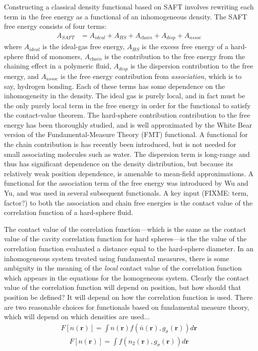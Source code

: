 \documentclass[letterpaper,twocolumn,amsmath,amssymb,prb]{revtex4-1}
\newcommand{\rr}{\textbf{r}}
\begin{document}
Constructing a classical density functional based on SAFT involves
rewriting each term in the free energy as a functional of an
inhomogeneous density.  The SAFT free energy consists of four terms:
\begin{align}
  A_\textit{SAFT} &= A_\textit{ideal} + A_\textit{HS} + A_\textit{chain} + A_\textit{disp} + A_\textit{assoc}
\end{align}
where $A_\textit{ideal}$ is the ideal-gas free energy, $A_\textit{HS}$
is the excess free energy of a hard-sphere fluid of monomers,
$A_\textit{chain}$ is the contribution to the free energy from the
chaining effect in a polymeric fluid, $A_\textit{disp}$ is the
dispersion contribution to the free energy, and $A_\textit{assoc}$ is
the free energy contribution from \emph{association}, which is to say,
hydrogen bonding.  Each of these terms has some dependence on the
inhomogeneity in the density.  The ideal gas is purely local, and in
fact must be the only purely local term in the free energy in order
for the functional to satisfy the contact-value theorem.  The
hard-sphere contribution contribution to the free energy has been
thoroughly studied, and is well approximated by the White Bear version
of the Fundamental-Measure Theory (FMT)
functional\cite{roth2002whitebear}.  A functional for the chain
contribution is has recently been introduced\cite{bryk2006density,
  gross2009density}, but is not needed for small associating molecules
such as water.  The dispersion term is long-range and thus has
significant dependence on the density distribution, but because its
relatively weak position dependence, is amenable to mean-field
approximations.  A functional for the association term of the free
energy was introduced by Wu and
Yu\cite{yu2002fmt-dft-inhomogeneous-associating}, and was used in
several subsequent functionals\cite{fu2005vapor-liquid-dft,
  bryk2006density}.  A key input (FIXME: term, factor?) to both the
association and chain free energies is the contact value of the
correlation function of a hard-sphere fluid.

The contact value of the correlation function---which is the same as
the contact value of the cavity correlation function for hard
spheres---is the the value of the correlation function evaluated a
distance equal to the hard-sphere diameter.  In an inhomogeneous
system treated using fundamental measures, there is some ambiguity in
the meaning of the \emph{local} contact value of the correlation
function which appears in the equations for the homogeneous system.
Clearly the contact value of the correlation function will depend on
position, but how should that position be defined? It will depend on
how the correlation function is used.  There are two reasonable
choices for functionals based on fundamental measure theory, which
will depend on which densities are used...
\begin{align}
  F[n(\rr)] = \int n(\rr) f(\bar{n}(\rr), g_\sigma(\rr)) d\rr
\end{align}
\begin{align}
  F[n(\rr)] = \int f(n_2(\rr), g_\sigma(\rr)) d\rr
\end{align}
\end{document}

